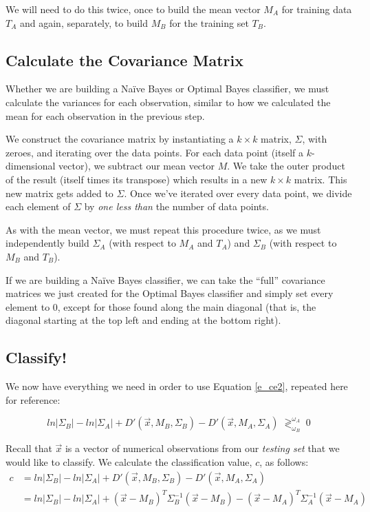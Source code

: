 \documentclass{article}
\begin{document}
We will need to do this twice, once to build the mean vector $M_A$ for training
data $T_A$ and again, separately, to build $M_B$ for the training set $T_B$.

\subsection{Calculate the Covariance Matrix}

Whether we are building a Na\"ive Bayes or Optimal Bayes classifier, we must
calculate the variances for each observation, similar to how we calculated
the mean for each observation in the previous step.

We construct the covariance matrix by instantiating a $k \times k$ matrix,
$\Sigma$, with zeroes, and iterating over the data points.  For each data point
(itself a $k$-dimensional vector), we subtract our mean vector $M$. We take the
outer product of the result (itself times its transpose) which results in a
new $k \times k$ matrix. This new matrix gets added to $\Sigma$. Once we've
iterated over every data point, we divide each element of $\Sigma$ by
\emph{one less than} the number of data points.

As with the mean vector, we must repeat this procedure twice, as we must
independently build $\Sigma_A$ (with respect to $M_A$ and
$T_A$) and $\Sigma_B$ (with respect to $M_B$ and $T_B$).

If we are building a Na\"ive Bayes classifier, we can take the ``full''
covariance matrices we just created for the Optimal Bayes classifier and simply
set every element to $0$, except for those found along the main diagonal (that
is, the diagonal starting at the top left and ending at the bottom right).

\subsection{Classify!}

We now have everything we need in order to use Equation \ref{e_ce2}, repeated
here for reference:

\begin{equation*}
ln|\Sigma_B| - ln|\Sigma_A| + D'(\vec{x},M_B,\Sigma_B) - D'(\vec{x},M_A,\Sigma_A)
\; \gtrless^{\omega_A}_{\omega_B} \; 0 
\end{equation*}

Recall that $\vec{x}$ is a vector of numerical observations from our
\emph{testing set} that we would like to classify. We calculate the
classification value, $c$, as follows:
\[\begin{split}
  c 
  &= ln|\Sigma_B| - ln|\Sigma_A| + D'(\vec{x},M_B,\Sigma_B) - D'(\vec{x},M_A,\Sigma_A) \\
  &= ln|\Sigma_B| - ln|\Sigma_A| + (\vec{x}-M_B)^T \Sigma_B^{-1} (\vec{x}-M_B) -(\vec{x}-M_A)^T \Sigma_A^{-1} (\vec{x}-M_A)
\end{split} \]
\end{document}
